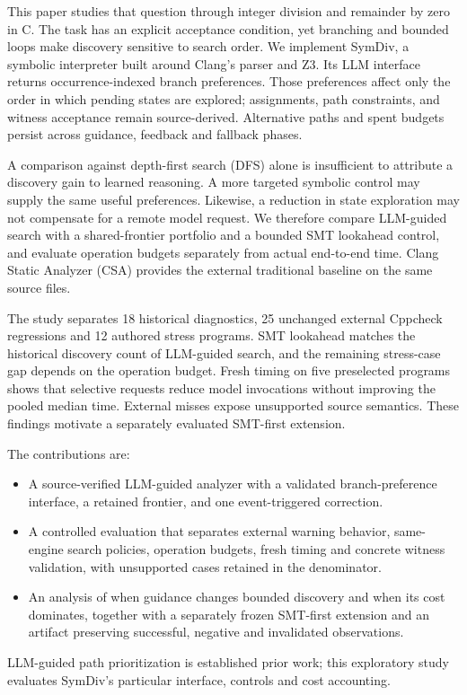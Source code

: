 \documentclass[sigconf]{acmart}
\begin{document}
This paper studies that question through integer division and remainder by
zero in C. The task has an explicit acceptance condition, yet branching and
bounded loops make discovery sensitive to search order. We implement SymDiv,
a symbolic interpreter built around Clang's parser and Z3. Its LLM interface
returns occurrence-indexed branch preferences. Those preferences affect only
the order in which pending states are explored; assignments, path constraints,
and witness acceptance remain source-derived. Alternative paths and spent
budgets persist across guidance, feedback and fallback phases.

A comparison against depth-first search (DFS) alone is insufficient to
attribute a discovery gain to learned reasoning. A more targeted symbolic
control may supply the same useful preferences. Likewise, a reduction in
state exploration may not compensate for a remote model request. We therefore
compare LLM-guided search with a shared-frontier portfolio and a bounded
SMT lookahead control, and evaluate operation budgets separately from actual
end-to-end time. Clang Static Analyzer (CSA) provides the external traditional
baseline on the same source files.

The study separates 18 historical diagnostics, 25 unchanged external Cppcheck
regressions and 12 authored stress programs. SMT lookahead matches the
historical discovery count of LLM-guided search, and the remaining stress-case
gap depends on the operation budget. Fresh timing on five preselected programs
shows that selective requests reduce model invocations without improving the
pooled median time. External misses expose unsupported source semantics.
These findings motivate a separately evaluated SMT-first extension.

The contributions are:
\begin{itemize}
\item A source-verified LLM-guided analyzer with a validated branch-preference
interface, a retained frontier, and one event-triggered correction.
\item A controlled evaluation that separates external warning behavior,
same-engine search policies, operation budgets, fresh timing and concrete
witness validation, with unsupported cases retained in the denominator.
\item An analysis of when guidance changes bounded discovery and when its
cost dominates, together with a separately frozen SMT-first extension and
an artifact preserving successful, negative and invalidated observations.
\end{itemize}
LLM-guided path prioritization is established prior work; this exploratory
study evaluates SymDiv's particular interface, controls and cost accounting.
\end{document}
